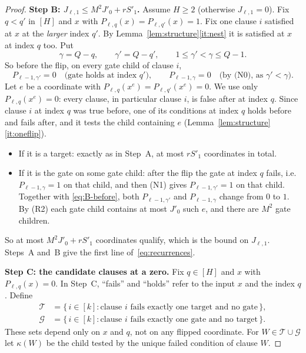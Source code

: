 \documentclass[11pt]{article}
\theoremstyle{definition}
\theoremstyle{remark}
\begin{document}
\begin{proof}
\medskip\noindent\textbf{Step B: \(J_{\ell,1}\le M^2J'_0+rS'_1\).}
Assume \(H\ge2\) (otherwise \(J_{\ell,1}=0\)). Fix \(q<q'\) in \([H]\) and
\(x\) with \(P_{\ell,q}(x)=P_{\ell,q'}(x)=1\). Fix one clause \(i\) satisfied
at \(x\) at the \emph{larger} index \(q'\). By
Lemma~\ref{lem:structure}\ref{it:nest} it is satisfied at \(x\) at index
\(q\) too. Put
\[
 \gamma=Q-q,\qquad \gamma'=Q-q',\qquad 1\leq \gamma'<\gamma\le Q-1 .
\]
So before the flip, on every gate child of clause \(i\),
\begin{equation}\label{eq:B-before}
 P_{\ell-1,\gamma'}=0\quad\text{(gate holds at index \(q'\))},\qquad
 P_{\ell-1,\gamma}=0\quad\text{(by (N0), as \(\gamma'<\gamma\))}.
\end{equation}
Let \(e\) be a coordinate with \(P_{\ell,q}(x^e)=P_{\ell,q'}(x^e)=0\). We use
only \(P_{\ell,q}(x^e)=0\): every clause, in particular clause \(i\), is
false after at index \(q\). Since clause \(i\) at index \(q\) was true
before, one of its conditions at index \(q\) holds before and fails after,
and it tests the child containing \(e\)
(Lemma~\ref{lem:structure}\ref{it:oneflip}).
\begin{itemize}[nosep]
\item If it is a target: exactly as in Step~A, at most \(rS'_1\) coordinates
 in total.
\item If it is the gate on some gate child: after the flip the gate at
 index \(q\) fails, i.e.\ \(P_{\ell-1,\gamma}=1\) on that child, and then
 (N1) gives \(P_{\ell-1,\gamma'}=1\) on that child. Together with
 \eqref{eq:B-before}, both \(P_{\ell-1,\gamma'}\) and \(P_{\ell-1,\gamma}\)
 change from \(0\) to \(1\). By (R2) each gate child contains at most
 \(J'_0\) such \(e\), and there are \(M^2\) gate children.
\end{itemize}
So at most \(M^2J'_0+rS'_1\) coordinates qualify, which is the bound on
\(J_{\ell,1}\). Steps~A and~B give the first line of~\eqref{eq:recurrences}.

\medskip\noindent\textbf{Step C: the candidate clauses at a zero.}
Fix \(q\in[H]\) and \(x\) with \(P_{\ell,q}(x)=0\). In Step~C, ``fails'' and
``holds'' refer to the input \(x\) and the index \(q\). Define
\begin{align*}
 \mathcal T&=\{\,i\in[k]:\text{clause \(i\) fails exactly one target and no gate}\,\},\\
 \mathcal G&=\{\,i\in[k]:\text{clause \(i\) fails exactly one gate and no target}\,\}.
\end{align*}
These sets depend only on \(x\) and \(q\), not on any flipped coordinate.
For \(W\in\mathcal T\cup\mathcal G\) let \(\kappa(W)\) be the child tested
by the unique failed condition of clause \(W\).


\end{proof}
\end{document}
